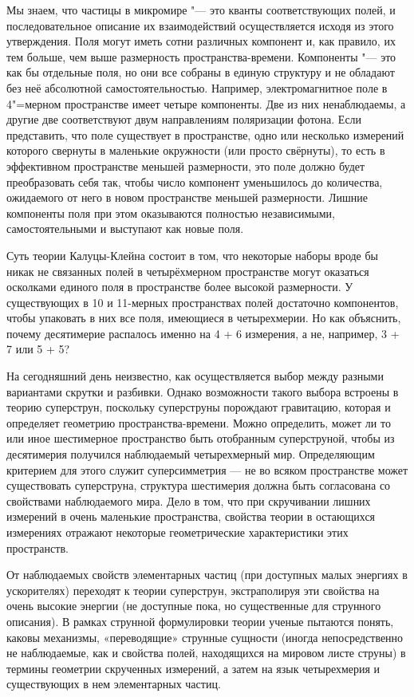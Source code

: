 Мы знаем, что частицы в микромире "--- это кванты соответствующих полей,
и последовательное описание их взаимодействий осуществляется исходя из этого утверждения.
Поля могут иметь сотни различных компонент и, как правило, их тем больше, чем выше размерность пространства-времени.
Компоненты "--- это как бы отдельные поля,
но они все собраны в единую структуру и не обладают без неё абсолютной самостоятельностью.
Например, электромагнитное поле в 4"=мерном пространстве имеет четыре компоненты.
Две из них ненаблюдаемы, а другие две соответствуют двум направлениям поляризации фотона.
Если представить, что поле существует в пространстве,
одно или несколько измерений которого свернуты в маленькие окружности (или просто свёрнуты),
то есть в эффективном пространстве меньшей размерности, это поле должно будет преобразовать себя так,
чтобы число компонент уменьшилось до количества, ожидаемого от него в новом пространстве меньшей размерности.
Лишние компоненты поля при этом оказываются полностью независимыми, самостоятельными и выступают как новые поля.

Суть теории Калуцы-Клейна состоит в том, что некоторые наборы вроде бы никак не связанных полей в четырёхмерном пространстве могут оказаться осколками единого поля в пространстве более высокой размерности. У существующих в 10 и 11-мерных пространствах полей достаточно компонентов, чтобы упаковать в них все поля, имеющиеся в четырехмерии. Но как объяснить, почему десятимерие распалось именно на 4 + 6 измерения, а не, например, 3 + 7 или 5 + 5?

На сегодняшний день неизвестно, как осуществляется выбор между разными вариантами скрутки и разбивки. Однако возможности такого выбора встроены в теорию суперструн, поскольку суперструны порождают гравитацию, которая и определяет геометрию пространства-времени. Можно определить, может ли то или иное шестимерное пространство быть отобранным суперструной, чтобы из десятимерия получился наблюдаемый четырехмерный мир. Определяющим критерием для этого служит суперсимметрия — не во всяком пространстве может существовать суперструна, структура шестимерия должна быть согласована со свойствами наблюдаемого мира. Дело в том, что при скручивании лишних измерений в очень маленькие пространства, свойства теории в остающихся измерениях отражают некоторые геометрические характеристики этих пространств.

От наблюдаемых свойств элементарных частиц (при доступных малых энергиях в ускорителях) переходят к теории суперструн, экстраполируя эти свойства на очень высокие энергии (не доступные пока, но существенные для струнного описания). В рамках струнной формулировки теории ученые пытаются понять, каковы механизмы, «переводящие» струнные сущности (иногда непосредственно не наблюдаемые, как и свойства полей, находящихся на мировом листе струны) в термины геометрии скрученных измерений, а затем на язык четырехмерия и существующих в нем элементарных частиц.

